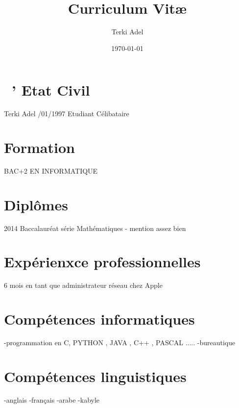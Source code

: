 \documentclass[a4paper]{article}
\title{Curriculum Vit\ae}
\author{Terki Adel}
\date{\today}
\begin{document}
\maketitle

\section{\ ' Etat Civil}
\noindent Terki 
Adel  /01/1997  \newline
Etudiant  \newline
Célibataire  \newline

\section{Formation}

BAC+2 EN INFORMATIQUE  \newline 


\section{Diplômes}

2014 Baccalauréat série Mathématiques - mention assez bien  \newline 


\section{Expérienxce professionnelles}

6 mois en tant que administrateur réseau chez Apple  \newline


\section{Compétences informatiques}


\noindent -programmation en C, PYTHON , JAVA , C++ , PASCAL .....  \newline 
-bureautique  \newline

\section{Compétences linguistiques}

\noindent -anglais  \newline
-français  \newline
-arabe  \newline
-kabyle  \newline
   \newline 
\end{document}
